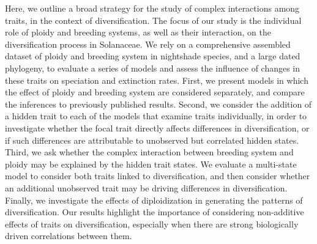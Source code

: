 Here, we outline a broad strategy for the study of complex interactions among traits, in the context of diversification.
The focus of our study is the individual role of ploidy and breeding systems, as well as their interaction, on the diversification process in Solanaceae. %
We rely on a comprehensive assembled dataset of ploidy and breeding system in nightshade species, and a large dated phylogeny, to evaluate a series of models and assess the influence of changes in these traits on speciation and extinction rates. %
First, we present models in which the effect of ploidy and breeding system are considered separately, and compare the inferences to previously published results. 
Second, we consider the addition of a hidden trait to each of the models that examine traits individually, in order to investigate whether the focal trait directly affects differences in diversification, or if such differences are attributable to unobserved but correlated hidden states.
Third, we ask whether the complex interaction between breeding system and ploidy may be explained by the hidden trait states. 
We evaluate a multi-state model to consider both traits linked to diversification, and then consider whether an additional unobserved trait may be driving differences in diversification.
Finally, we investigate the effects of diploidization in generating the patterns of diversification. 
Our results highlight the importance of considering non-additive effects of traits on diversification, especially when there are strong biologically driven correlations between them.




